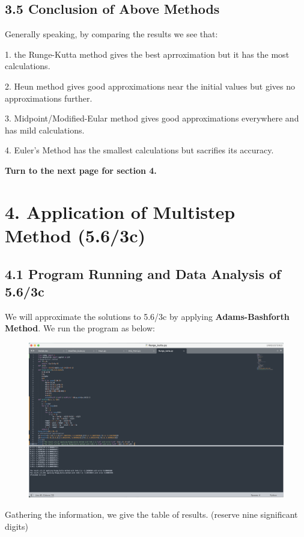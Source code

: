 \documentclass{article}
\begin{document}
\subsection{3.5 Conclusion of Above Methods}
    Generally speaking, by comparing the results we see that: 

    1. the Runge-Kutta method gives the best aprroximation but it has the most calculations. 

    2. Heun method gives good approximations near the initial values but gives no approximations further.

    3. Midpoint/Modified-Eular method gives good approximations everywhere and has mild calculations. 

    4. Euler's Method has the smallest calculations but sacrifies its accuracy.

    \textbf{Turn to the next page for section 4.}

\newpage
\section{4. Application of Multistep Method (5.6/3c)}
\subsection{4.1 Program Running and Data Analysis of 5.6/3c }
    We will approximate the solutions to 5.6/3c by applying \textbf{Adams-Bashforth Method}. We run the program as below:

    \begin{figure}[h]
    \centering
    \includegraphics[scale=0.2]{Program4}
    \end{figure}

    Gathering the information, we give the table of results. (reserve nine significant digits)
\end{document}
